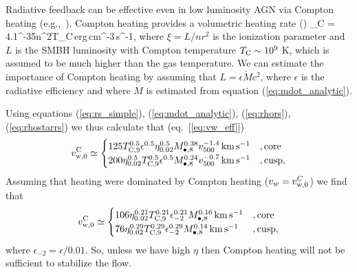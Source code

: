 \documentclass[usenatbib,fleqn]{mn2e}
\begin{document}
Radiative feedback can be effective even in low luminosity AGN via Compton heating (e.g.,~\citealt{Gan+14}).  Compton heating provides a volumetric heating rate (\citealt{Gan+14})
\be
{}_{\rm C} = 4.1^{-35}n^{2}\xi T_{\rm C}\,{\rm erg\,cm^{-3}\,s^{-1}},
\ee
where $\xi = L/n r^{2}$ is the ionization parameter and $L$ is the SMBH luminosity with Compton temperature $T_{\rm C} \sim 10^{9}$ K, which is assumed to be much higher than the gas temperature.  We can estimate the importance of Compton heating by assuming that $L = \epsilon \dot{M}c^{2}$, where $\epsilon$ is the radiative efficiency and where $\dot{M}$ is estimated from equation (\ref{eq:mdot_analytic}). 

Using equations (\ref{eq:rs_simple}), (\ref{eq:mdot_analytic}), (\ref{eq:rhors}), (\ref{eq:rhostarrs}) we thus calculate that (eq.~[\ref{eq:vw_eff}])
\begin{align}
v_{\rm w,0}^{\rm C}  \simeq
  \begin{cases}
   125 T_{\rm C,9}^{0.5}\epsilon^{0.5}\eta_{0.02}^{0.5} M_{\bullet,8}^{0.38}v_{500}^{-1.4}\,{\rm km\,s^{-1}}  &, \text{core}\\
   200 \eta_{0.02}^{0.5}T_{\rm C,9}^{0.5}\epsilon^{0.5} M_{\bullet,8}^{0.24}v_{500}^{-0.7}\,{\rm km\,s^{-1}}   &, \text{cusp},     
  \end{cases}
  \label{eq:vC}
\end{align}
Assuming that heating were dominated by Compton heating ($v_{w} = v_{\rm w,0}^{C}$) we find that
\begin{align}
v_{\rm w,0}^{\rm C}  \simeq
  \begin{cases}
   106 \eta_{0.02}^{0.21}T_{\rm C,9}^{0.21}\epsilon_{-2}^{0.21} M_{\bullet,8}^{0.16}\,{\rm km\,s^{-1}}  &, \text{core}\\
   76 \eta_{0.02}^{0.29}T_{\rm C,9}^{0.29}\epsilon_{-2}^{0.29} M_{\bullet,8}^{0.14}\,{\rm km\,s^{-1}}   &, \text{cusp},     
  \end{cases}
  \label{eq:vC2}
\end{align}
where $\epsilon_{-2} = \epsilon/0.01$.  So, unless we have high $\eta$ then Compton heating will not be sufficient to stabilize the flow.
\end{document}
